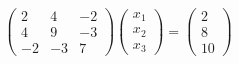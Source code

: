 \documentclass[preview]{standalone}
\begin{document}
\begin{align*}
\begin{pmatrix} 2 & 4 & -2 \\ 4 & 9 & -3 \\ -2 & -3 & 7 \end{pmatrix} \begin{pmatrix} x_1 \\ x_2 \\ x_3 \end{pmatrix} = \begin{pmatrix} 2 \\ 8 \\ 10 \end{pmatrix}
\end{align*}
\end{document}
